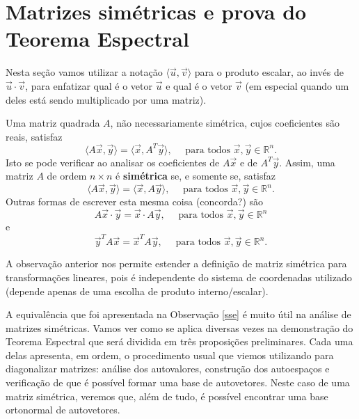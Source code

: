 \construirExer

\section{Matrizes simétricas e prova do Teorema Espectral}

Nesta seção vamos utilizar a notação $\langle \vec{u}, \vec{v} \rangle$ para o produto escalar, ao invés de $\vec{u} \cdot \vec{v}$, para enfatizar qual é o vetor $\vec{u}$ e qual é o vetor $\vec{v}$ (em especial quando um deles está sendo multiplicado por uma matriz).

\begin{obs}\label{sse}
	Uma matriz quadrada $A$, não necessariamente simétrica, cujos coeficientes são reais, satisfaz
	\begin{equation}
	\langle A \vec{x}, \vec{y} \rangle = \langle\vec{x}, A^T \vec{y}\rangle, \quad \text{ para todos } \vec{x}, \vec{y} \in \mathbb{R}^n.
	\end{equation} Isto se pode verificar ao analisar os coeficientes de $A \vec{x}$ e de $A^T \vec{y}$. Assim, uma matriz $A$ de ordem $n \times n$ é \textbf{simétrica} se, e somente se, satisfaz
	\begin{equation}
	\langle A \vec{x}, \vec{y} \rangle = \langle\vec{x}, A \vec{y}\rangle, \quad \text{ para todos } \vec{x}, \vec{y} \in \mathbb{R}^n.
	\end{equation}
	Outras formas de escrever esta mesma coisa (concorda?) são
	\begin{equation}
	A \vec{x} \cdot \vec{y} = \vec{x} \cdot A \vec{y}, \quad \text{ para todos } \vec{x}, \vec{y} \in \mathbb{R}^n
	\end{equation} e
	\begin{equation}
	\vec{y}^T A \vec{x} = \vec{x}^T A \vec{y}, \quad \text{ para todos } \vec{x}, \vec{y} \in \mathbb{R}^n.
	\end{equation}
\end{obs}

\begin{obs}
	A observação anterior nos permite estender a definição de matriz simétrica para transformações lineares, pois é independente do sistema de coordenadas utilizado (depende apenas de uma escolha de produto interno/escalar).
\end{obs}

A equivalência que foi apresentada na Observação \ref{sse} é muito útil na análise de matrizes simétricas. Vamos ver como se aplica diversas vezes na demonstração do Teorema Espectral que será dividida em três proposições preliminares. Cada uma delas apresenta, em ordem, o procedimento usual que viemos utilizando para diagonalizar matrizes: análise dos autovalores, construção dos autoespaços e verificação de que é possível formar uma base de autovetores. Neste caso de uma matriz simétrica, veremos que, além de tudo, é possível encontrar uma base ortonormal de autovetores.

